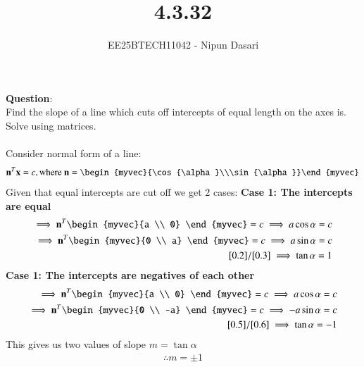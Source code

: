 \documentclass[journal]{IEEEtran}
\begin{document}
	
	
	\vspace{3cm}
	
	\title{4.3.32}
	\author{EE25BTECH11042 - Nipun Dasari}
	\maketitle
		
	\renewcommand{\thefigure}{\theenumi}
	\renewcommand{\thetable}{\theenumi}
	\setlength{\intextsep}{10pt} %
	
	
	\renewcommand{\thetable}{\theenumi}
	
	\textbf{Question}:\\
	Find the slope of a line which cuts off intercepts of equal length on the axes is. Solve using matrices. \\ 
	\solution \\
	
	Consider normal form of a line:
	\begin{align}
		\vec{n}^T\vec{x} = c, \text{where } \vec{n} = \begin{myvec}{\cos{\alpha}\\\sin{\alpha}}\end{myvec}
	\end{align}
	Given that equal intercepts are cut off we get 2 cases:
	\textbf{Case 1: The intercepts are equal }
	\begin{align}
		\implies  \vec{n}^T\begin{myvec}{a \\ 0} \end{myvec} = c \implies a\cos{\alpha} = c \label{0.2}\\
		\implies \vec{n}^T\begin{myvec}{0 \\ a} \end{myvec} =c \implies a\sin{\alpha} = c \label{0.3} \\
		\eqref{0.2}/\eqref{0.3} \implies \tan{\alpha} = 1		
	\end{align}
	\textbf{Case 1: The intercepts are negatives of each other }
	\begin{align}
		\implies  \vec{n}^T\begin{myvec}{a \\ 0} \end{myvec} = c \implies a\cos{\alpha} = c \label{0.5}\\
		\implies \vec{n}^T\begin{myvec}{0 \\ -a} \end{myvec} =c \implies -a\sin{\alpha} = c \label{0.6} \\
		\eqref{0.5}/\eqref{0.6} \implies \tan{\alpha} = -1		
	\end{align}
	This gives us two values of slope $m=\tan{\alpha}$
	\begin{align}
		\therefore m = \pm1
	\end{align}
\end{document}
